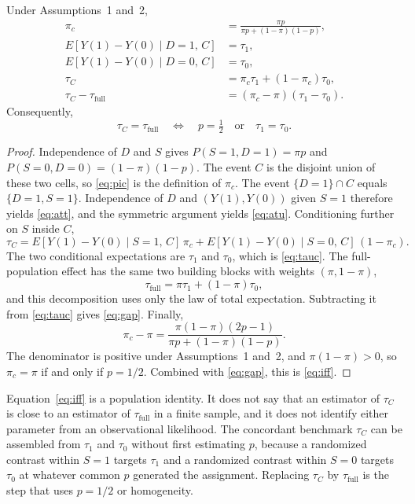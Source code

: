 \documentclass[twoside,11pt]{article}
\begin{document}
\begin{proposition}
\label{prop:concordant}
Under Assumptions~1 and~2,
\begin{align}
\pi_c
&=
\frac{\pi p}{\pi p+(1-\pi)(1-p)},
\label{eq:pic}\\
E[Y(1)-Y(0)\mid D=1,\,C]
&=
\tau_1,
\label{eq:att}\\
E[Y(1)-Y(0)\mid D=0,\,C]
&=
\tau_0,
\label{eq:atu}\\
\tau_C
&=
\pi_c\tau_1+(1-\pi_c)\tau_0,
\label{eq:tauc}\\
\tau_C-\tau_{\mathrm{full}}
&=
(\pi_c-\pi)(\tau_1-\tau_0).
\label{eq:gap}
\end{align}
Consequently,
\begin{equation}
\tau_C=\tau_{\mathrm{full}}
\quad\Longleftrightarrow\quad
p=\tfrac12
\quad\text{or}\quad
\tau_1=\tau_0.
\label{eq:iff}
\end{equation}
\end{proposition}

\begin{proof}
Independence of $D$ and $S$ gives $P(S=1,D=1)=\pi p$ and $P(S=0,D=0)=(1-\pi)(1-p)$. The event $C$ is the disjoint union of these two cells, so \eqref{eq:pic} is the definition of $\pi_c$. The event $\{D=1\}\cap C$ equals $\{D=1,S=1\}$. Independence of $D$ and $(Y(1),Y(0))$ given $S=1$ therefore yields \eqref{eq:att}, and the symmetric argument yields \eqref{eq:atu}. Conditioning further on $S$ inside $C$,
\[
\tau_C
=
E[Y(1)-Y(0)\mid S=1,\,C]\,\pi_c
+
E[Y(1)-Y(0)\mid S=0,\,C]\,(1-\pi_c).
\]
The two conditional expectations are $\tau_1$ and $\tau_0$, which is \eqref{eq:tauc}. The full-population effect has the same two building blocks with weights $(\pi,1-\pi)$,
\[
\tau_{\mathrm{full}}=\pi\tau_1+(1-\pi)\tau_0,
\]
and this decomposition uses only the law of total expectation. Subtracting it from \eqref{eq:tauc} gives \eqref{eq:gap}. Finally,
\[
\pi_c-\pi
=
\frac{\pi(1-\pi)(2p-1)}{\pi p+(1-\pi)(1-p)}.
\]
The denominator is positive under Assumptions~1 and~2, and $\pi(1-\pi)>0$, so $\pi_c=\pi$ if and only if $p=1/2$. Combined with \eqref{eq:gap}, this is \eqref{eq:iff}.
\end{proof}

Equation~\eqref{eq:iff} is a population identity. It does not say that an estimator of $\tau_C$ is close to an estimator of $\tau_{\mathrm{full}}$ in a finite sample, and it does not identify either parameter from an observational likelihood. The concordant benchmark $\tau_C$ can be assembled from $\tau_1$ and $\tau_0$ without first estimating $p$, because a randomized contrast within $S=1$ targets $\tau_1$ and a randomized contrast within $S=0$ targets $\tau_0$ at whatever common $p$ generated the assignment. Replacing $\tau_C$ by $\tau_{\mathrm{full}}$ is the step that uses $p=1/2$ or homogeneity.
\end{document}
